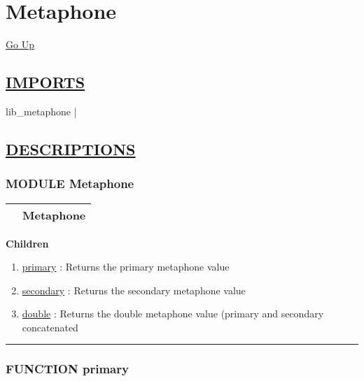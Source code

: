 \chapter*{\color{headfile}
Metaphone
}
\hypertarget{ecldoc:toc:Metaphone}{}
\hyperlink{ecldoc:toc:root}{Go Up}

\section*{\underline{\textsf{IMPORTS}}}
\begin{doublespace}
{\large
lib\_metaphone |
}
\end{doublespace}

\section*{\underline{\textsf{DESCRIPTIONS}}}
\subsection*{\textsf{\colorbox{headtoc}{\color{white} MODULE}
Metaphone}}

\hypertarget{ecldoc:Metaphone}{}

{\renewcommand{\arraystretch}{1.5}
\begin{tabularx}{\textwidth}{|>{\raggedright\arraybackslash}l|X|}
\hline
\hspace{0pt}\mytexttt{\color{red} } & \textbf{Metaphone} \\
\hline
\end{tabularx}
}

\par


\textbf{Children}
\begin{enumerate}
\item \hyperlink{ecldoc:metaphone.primary}{primary}
: Returns the primary metaphone value
\item \hyperlink{ecldoc:metaphone.secondary}{secondary}
: Returns the secondary metaphone value
\item \hyperlink{ecldoc:metaphone.double}{double}
: Returns the double metaphone value (primary and secondary concatenated
\end{enumerate}

\rule{\linewidth}{0.5pt}

\subsection*{\textsf{\colorbox{headtoc}{\color{white} FUNCTION}
primary}}

